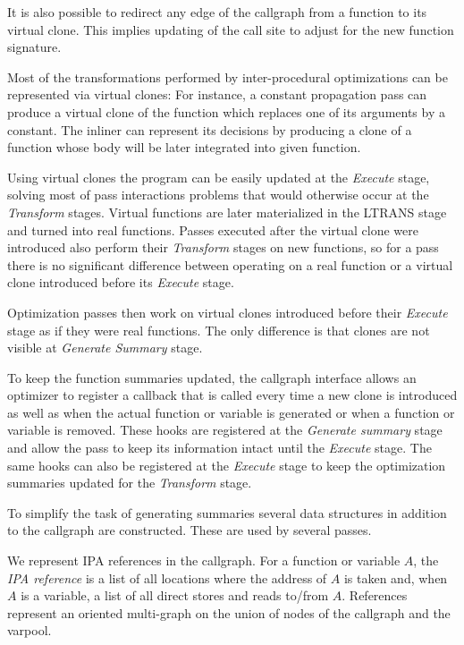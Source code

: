 \documentclass[final]{ols}
\begin{document}
It is also possible to redirect any edge of the callgraph from a function to its
virtual clone.  This implies updating of the call site to adjust for the new function
signature.

Most of the transformations performed by inter-procedural optimizations can be
represented via virtual clones: For instance, a constant propagation pass can produce a virtual
clone of the function which replaces one of its arguments by a constant. The inliner can
represent its decisions by producing a clone of a function whose body will be
later integrated into given function.

Using virtual clones the program can be easily updated at the {\em Execute} stage,
solving most of pass interactions problems that would otherwise occur at
the {\em Transform} stages.  Virtual functions are later materialized in the
LTRANS stage and turned into real functions.  Passes executed after the virtual
clone were introduced also perform their {\em Transform} stages on new
functions, so for a pass there is no significant difference between operating
on a real function or a virtual clone introduced before its {\em Execute}
stage.

Optimization passes then work on virtual clones introduced before their {\em
Execute} stage as if they were real functions. The only difference is that
clones are not visible at {\em Generate Summary} stage.

To keep the function summaries updated, the callgraph interface allows an optimizer to
register a callback that is called every time a new clone is introduced as well
as when the actual function or variable is generated or when a function or
variable is removed.  These hooks are registered at the {\em Generate summary}
stage and allow the pass to keep its information intact until the {\em
Execute} stage. The same hooks can also be registered at the {\em Execute}
stage to keep the optimization summaries updated for the {\em Transform} stage.

To simplify the task of generating summaries several data structures in
addition to the callgraph are constructed.  These are used by several passes.

We represent IPA references in the callgraph.  For a function or variable
$A$, the {\em IPA reference} is a list of all locations where the address of $A$ is
taken and, when $A$ is a variable, a list of all direct stores and reads to/from
$A$. References represent an oriented multi-graph on the union of nodes
of the callgraph and the varpool.
\end{document}
